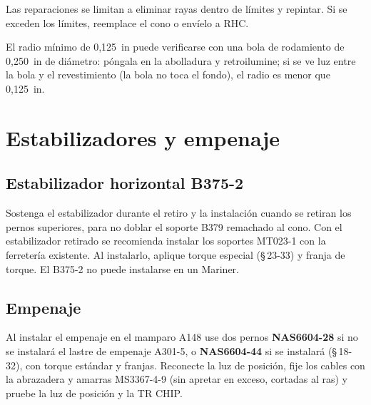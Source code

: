 Las reparaciones se limitan a eliminar rayas dentro de límites y repintar. Si se exceden los límites, reemplace el cono o envíelo a RHC.

\begin{checklist}
\end{checklist}

\begin{nota}
El radio mínimo de 0,125~in puede verificarse con una bola de rodamiento de 0,250~in de diámetro: póngala en la abolladura y retroilumine; si se ve luz entre la bola y el revestimiento (la bola no toca el fondo), el radio es menor que 0,125~in.
\end{nota}

\section{Estabilizadores y empenaje}

\subsection{Estabilizador horizontal B375-2}

Sostenga el estabilizador durante el retiro y la instalación cuando se retiran los pernos superiores, para no doblar el soporte B379 remachado al cono. Con el estabilizador retirado se recomienda instalar los soportes MT023-1 con la ferretería existente. Al instalarlo, aplique torque especial (\S\,23-33) y franja de torque. El B375-2 no puede instalarse en un Mariner.

\subsection{Empenaje}

Al instalar el empenaje en el mamparo A148 use dos pernos \textbf{NAS6604-28} si no se instalará el lastre de empenaje A301-5, o \textbf{NAS6604-44} si se instalará (\S\,18-32), con torque estándar y franjas. Reconecte la luz de posición, fije los cables con la abrazadera y amarras MS3367-4-9 (sin apretar en exceso, cortadas al ras) y pruebe la luz de posición y la \textsf{TR CHIP}.

